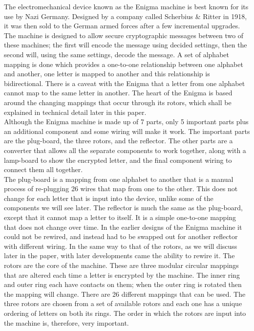 \documentclass[12pt,a4paper]{article}
\begin{document}
The electromechanical device known as the Enigma machine is best known for its use by Nazi Germany. Designed by a company called Scherbius \& Ritter in 1918, it was then sold to the German armed forces after a few incremental upgrades. The machine is designed to allow secure cryptographic messages between two of these machines; the first will encode the message using decided settings, then the second will, using the same settings, decode the message. A set of alphabet mapping is done which provides a one-to-one relationship between one alphabet and another, one letter is mapped to another and this relationship is bidirectional. There is a caveat with the Enigma that a letter from one alphabet cannot map to the same letter in another. The heart of the Enigma is based around the changing mappings that occur through its rotors, which shall be explained in technical detail later in this paper.\\

Although the Enigma machine is made up of 7 parts, only 5 important parts plus an additional component and some wiring will make it work. The important parts are the plug-board, the three rotors, and the reflector. The other parts are a converter that allows all the separate components to work together, along with a lamp-board to show the encrypted letter, and the final component wiring to connect them all together.\\

The plug-board is a mapping from one alphabet to another that is a manual process of re-plugging 26 wires that map from one to the other. This does not change for each letter that is input into the device, unlike some of the components we will see later. The reflector is much the same as the plug-board, except that it cannot map a letter to itself. It is a simple one-to-one mapping that does not change over time. In the earlier designs of the Enigma machine it could not be rewired, and instead had to be swapped out for another reflector with different wiring. In the same way to that of the rotors, as we will discuss later in the paper, with later developments came the ability to rewire it. The rotors are the core of the machine. These are three modular circular mappings that are altered each time a letter is encrypted by the machine. The inner ring and outer ring each have contacts on them; when the outer ring is rotated then the mapping will change. There are 26 different mappings that can be used. The three rotors are chosen from a set of available rotors and each one has a unique ordering of letters on both its rings. The order in which the rotors are input into the machine is, therefore, very important.\\
\end{document}
